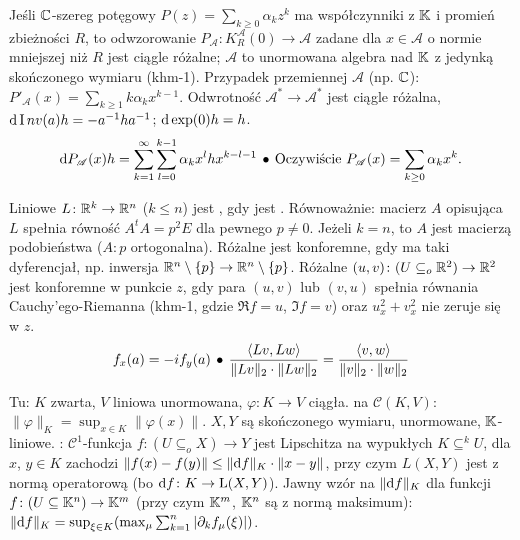 Jeśli  $\mathbb{C}$-szereg potęgowy $P(z) = \sum_{k \ge 0} \alpha_k z^k$ ma współczynniki z $\mathbb{K}$ i promień zbieżności $R$, to odwzorowanie $P_{\mathscr A} \colon K_R^{\mathscr A} (0) \to \mathscr A$ zadane dla $x \in \mathscr A$ o normie mniejszej niż $R$ jest ciągle różalne; $\mathscr A$ to unormowana algebra nad $\mathbb{K}$ z jedynką skończonego wymiaru (khm-1).
Przypadek przemiennej $\mathscr A$ (np. $\mathbb{C}$): $P'_{\mathscr A}(x) = \sum_{k \ge 1} k \alpha_k x^{k-1}$.
Odwrotność $\mathscr A^* \to \mathscr A^*$ jest ciągle różalna, $\textrm{d} \operatorname Inv (a) h = -a^{-1} h a^{-1}$; $\textrm{d}\,{\exp}(0)h = h$.
\[
	\textrm{d}{P_{\mathscr A}}(x)h = \sum_{k=1}^\infty \sum_{l = 0}^{k - 1} \alpha_k x^l h x^{k-l-1} \, \bullet \,
	\textrm{Oczywiście } P_{\mathscr A}(x) = \sum_{k \ge 0} \alpha_k x^k.
\]

Liniowe  $L \colon \mathbb{R}^k \to \mathbb{R}^n$ ($k \le n$) jest , gdy jest .
Równoważnie: macierz $A$ opisująca $L$ spełnia równość $A^tA = p^2 E$ dla pewnego $p \neq 0$.
Jeżeli $k = n$, to $A$ jest macierzą podobieństwa ($A:p$ ortogonalna).
Różalne jest konforemne, gdy ma taki dyferencjał, np. inwersja $\mathbb{R}^n \setminus \{p\} \to \mathbb{R}^n \setminus \{p\}$.
Różalne $(u, v) \colon (U \subseteq_o \mathbb{R}^2) \to \mathbb{R}^2$ jest konforemne w punkcie $z$, gdy para $(u, v)$ lub $(v, u)$ spełnia równania Cauchy'ego-Riemanna (khm-1, gdzie $\Re f = u$, $\Im f = v$) oraz $u_x^2 + v_x^2$ nie zeruje się w $z$.
\[
	f_x(a) = -i f_y(a) \, \bullet \,
	\frac{\langle Lv, Lw \rangle}{\|Lv\|_2 \cdot \|Lw\|_2} = \frac{\langle v,w\rangle}{\|v\|_2 \cdot \|w\|_2}
\]

Tu:  $K$ zwarta, $V$ liniowa unormowana, $\varphi \colon K \to V$ ciągła.
 na $\mathscr C(K, V)$: $\| \varphi \|_K = \sup_{x \in K} \|\varphi(x)\|$.
$X, Y$ są skończonego wymiaru, unormowane, $\mathbb{K}$-liniowe.
: $\mathscr C^1$-funkcja $f\colon (U \subseteq_o X) \to Y$ jest Lipschitza na wypukłych $K \subseteq^k U$, dla $x$, $y \in K$ zachodzi $\|f(x) - f(y)\| \le \|\textrm{d} f\|_K \cdot \|x-y\|$, przy czym $L(X,Y)$ jest z normą operatorową (bo $\textrm{d} f \colon K \to \textrm L(X, Y)$).
Jawny wzór na $\|\textrm{d} f\|_K$ dla funkcji $f \colon (U \subseteq \mathbb{K}^n) \to \mathbb{K}^m$ (przy czym $\mathbb{K}^m$, $\mathbb{K}^n$ są z normą maksimum): $\|\textrm{d} f\|_K = \sup_{\xi \in K} (\max_\mu \sum_{k=1}^n |\partial_k f_\mu(\xi)|)$.

